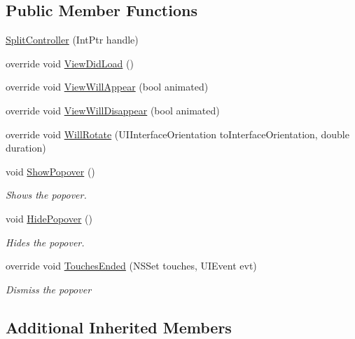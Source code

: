 \subsection*{Public Member Functions}
\begin{DoxyCompactItemize}
\item 
\hyperlink{class_field_service_1_1i_o_s_1_1_split_controller_a3e8fafe76cf844c4d3b969cf31b9bbcc}{Split\+Controller} (Int\+Ptr handle)
\item 
override void \hyperlink{class_field_service_1_1i_o_s_1_1_split_controller_aa16acbf67fb07d94586f5bda136b7e27}{View\+Did\+Load} ()
\item 
override void \hyperlink{class_field_service_1_1i_o_s_1_1_split_controller_a2a61f1f25f6ab2afa745f9d8af57f772}{View\+Will\+Appear} (bool animated)
\item 
override void \hyperlink{class_field_service_1_1i_o_s_1_1_split_controller_a4643170aea334fd59f9f273668318104}{View\+Will\+Disappear} (bool animated)
\item 
override void \hyperlink{class_field_service_1_1i_o_s_1_1_split_controller_a5228e2219bf9050277abbcb2c6d14fd7}{Will\+Rotate} (U\+I\+Interface\+Orientation to\+Interface\+Orientation, double duration)
\item 
void \hyperlink{class_field_service_1_1i_o_s_1_1_split_controller_a4b9a606ab07da57b08687831a54f973c}{Show\+Popover} ()
\begin{DoxyCompactList}\small\item\em Shows the popover. \end{DoxyCompactList}\item 
void \hyperlink{class_field_service_1_1i_o_s_1_1_split_controller_ac003e88566e895a387f43fa0de1c53c7}{Hide\+Popover} ()
\begin{DoxyCompactList}\small\item\em Hides the popover. \end{DoxyCompactList}\item 
override void \hyperlink{class_field_service_1_1i_o_s_1_1_split_controller_a7872b0e5ba4b27c34d878e9ea24b28a2}{Touches\+Ended} (N\+S\+Set touches, U\+I\+Event evt)
\begin{DoxyCompactList}\small\item\em Dismiss the popover \end{DoxyCompactList}\end{DoxyCompactItemize}
\subsection*{Additional Inherited Members}


